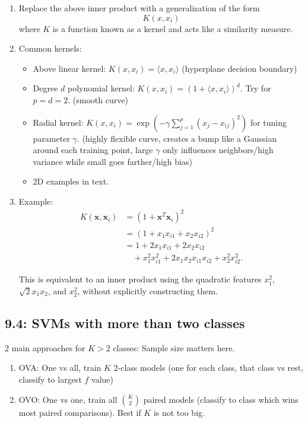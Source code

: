 \documentclass{article}
\begin{document}
\begin{enumerate}
\begin{enumerate}
Here, $S$ is the set of support vectors, $y_j \in \{-1,1\}$ is the class label, and $\alpha_j > 0$ is the corresponding coefficient. All training observations that are not support vectors have $\alpha_j=0$ and therefore do not contribute to the classifier.
\item Replace the above inner product with a generalization of the form
\[
K(x, x_i)
\]
where $K$ is a function known as a kernel and acts like a similarity measure.
\item Common kernels:
\begin{itemize}
\item Above linear kernel: $K(x, x_i) = \langle x , x_i \rangle$ (hyperplane decision boundary)
\item Degree $d$ polynomial kernel: $K(x, x_i) = (1+\langle x , x_i \rangle)^d$. Try for $p=d=2$. (smooth curve)
\item Radial kernel: $K(x,x_i) = \exp{\left(-\gamma \sum_{j=1}^p (x_j - x_{ij})^2\right)}$ for tuning parameter $\gamma$. (highly flexible curve, creates a bump like a Gaussian around each training point, large $\gamma$ only influences neighbors/high variance while small goes farther/high bias)
\item 2D examples in text.
\end{itemize}

\item Example: \[
\begin{aligned}
K(\mathbf{x},\mathbf{x}_i)
&= (1+\mathbf{x}^T\mathbf{x}_i)^2\\
&= (1+x_1x_{i1}+x_2x_{i2})^2\\
&= 1+2x_1x_{i1}+2x_2x_{i2}\\
&\quad +x_1^2x_{i1}^2
+2x_1x_2x_{i1}x_{i2}
+x_2^2x_{i2}^2.
\end{aligned}
\]

This is equivalent to an inner product using the quadratic features
$x_1^2$, $\sqrt{2}x_1x_2$, and $x_2^2$, without explicitly constructing them.
\end{enumerate}

\end{enumerate}

\subsection*{9.4: SVMs with more than two classes}

2 main approaches for $K>2$ classes: Sample size matters here.
\begin{enumerate}
\item OVA: One vs all, train $K$ 2-class models (one for each class, that class vs rest, classify to largest $f$ value)
\item OVO: One vs one, train all $\binom{K}{2}$ paired models (classify to class which wins most paired comparisons). Best if $K$ is not too big.
\end{enumerate}
\end{document}
